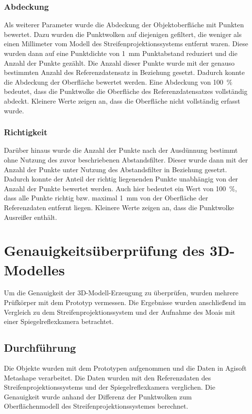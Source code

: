 \documentclass[./00PhotoBox.tex]{subfiles}
\begin{document}
\subsubsection{Abdeckung}
Als weiterer Parameter wurde die Abdeckung der Objektoberfläche mit Punkten bewertet. Dazu wurden die Punktwolken auf diejenigen gefiltert, die weniger als einen Millimeter vom Modell des Streifenprojektionssystems entfernt waren. Diese wurden dann auf eine Punktdichte von \SI{1}{\milli\metre} Punktabstand reduziert und die Anzahl der Punkte gezählt. Die Anzahl dieser Punkte wurde mit der genauso bestimmten Anzahl des Referenzdatensatz in Beziehung gesetzt. Dadurch konnte die Abdeckung der Oberfläche bewertet werden. Eine Abdeckung von \SI{100}{\percent} bedeutet, dass die Punktwolke die Oberfläche des Referenzdatensatzes vollständig abdeckt. Kleinere Werte zeigen an, dass die Oberfläche nicht vollständig erfasst wurde.

\subsubsection{Richtigkeit}
Darüber hinaus wurde die Anzahl der Punkte nach der Ausdünnung bestimmt ohne Nutzung des zuvor beschriebenen Abstandsfilter. Dieser wurde dann mit der Anzahl der Punkte unter Nutzung des Abstandsfilter in Beziehung gesetzt. Dadurch konnte der Anteil der richtig liegenenden Punkte unabhängig von der Anzahl der Punkte bewertet werden. Auch hier bedeutet ein Wert von \SI{100}{\percent}, dass alle Punkte richtig bzw. maximal \SI{1}{\milli\metre} von der Oberfläche der Referenzdaten entfernt liegen. Kleinere Werte zeigen an, dass die Punktwolke Ausreißer enthält.




\section{Genauigkeitsüberprüfung des 3D-Modelles}
\label{s:genauigkeitsueberpruefung}
Um die Genauigkeit der 3D-Modell-Erzeugung zu überprüfen, wurden mehrere Prüf\-körper mit dem Prototyp vermessen. Die Ergebnisse wurden anschließend im Vergleich zu dem Streifenprojektionssystem und der Aufnahme des Moais mit einer Spiegelreflexkamera betrachtet.

\subsection{Durchführung}
Die Objekte wurden mit dem Prototypen aufgenommen und die Daten in Agisoft Metashape verarbeitet. Die Daten wurden mit den Referenzdaten des Streifenprojektionssystems und der Spiegelreflexkamera verglichen. Die Genauigkeit wurde anhand der Differenz der Punktwolken zum Oberflächenmodell des Streifenprojektionssystemes berechnet.
\end{document}

